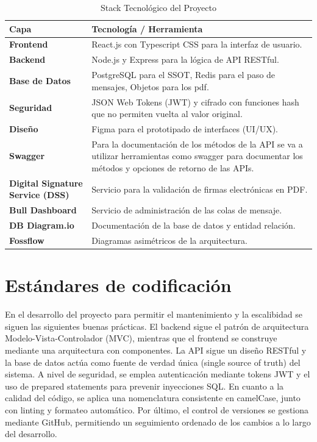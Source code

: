 \begin{table}[htpb]
\centering
\caption{Stack Tecnológico del Proyecto}
\label{tab:tecnologias}
\begin{tabularx}{\textwidth}{l X}
\toprule
\textbf{Capa} & \textbf{Tecnología / Herramienta} \\ \midrule
\textbf{Frontend} & React.js con Typescript CSS para la interfaz de usuario. \\
\textbf{Backend} & Node.js y Express para la lógica de API RESTful. \\
\textbf{Base de Datos} & PostgreSQL para el SSOT, Redis para el paso de mensajes, Objetos para los pdf. \\
\textbf{Seguridad} & JSON Web Tokens (JWT) y cifrado con funciones hash que no permiten vuelta al valor original. \\
\textbf{Diseño} & Figma para el prototipado de interfaces (UI/UX). \\
\textbf{Swagger} & Para la documentación de los métodos de la API se va a utilizar herramientas como swagger para documentar los métodos y opciones de retorno de las APIs. \\
\textbf{Digital Signature Service (DSS)} & Servicio para la validación de firmas electrónicas en PDF. \\
\textbf{Bull Dashboard} & Servicio de administración de las colas de mensaje. \\
\textbf{DB Diagram.io} & Documentación de la base de datos y entidad relación. \\
\textbf{Fossflow} & Diagramas asimétricos de la arquitectura. \\
\bottomrule
\end{tabularx}
\end{table}

\newpage

\section{Estándares de codificación}

En el desarrollo del proyecto para permitir el mantenimiento y la escalibidad se siguen las siguientes buenas prácticas. El backend sigue el patrón de arquitectura Modelo-Vista-Controlador (MVC), mientras que el frontend se construye mediante una arquitectura con componentes. La API sigue un diseño RESTful y la base de datos actúa como fuente de verdad única (single source of truth) del sistema. A nivel de seguridad, se emplea autenticación mediante tokens JWT y el uso de prepared statements para prevenir inyecciones SQL. En cuanto a la calidad del código, se aplica una nomenclatura consistente en camelCase, junto con linting y formateo automático. Por último, el control de versiones se gestiona mediante GitHub, permitiendo un seguimiento ordenado de los cambios a lo largo del desarrollo.

